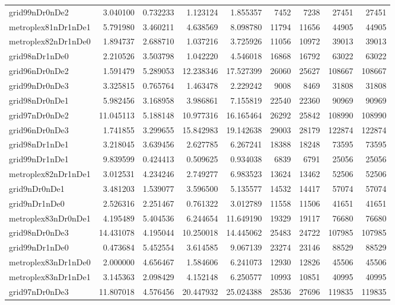 \begin{longtable}{|l|r|r|r|r|r|r|r|r|}
grid99nDr0nDe2 & 3.040100 & 0.732233 & 1.123124 & 1.855357 & 7452 & 7238 & 27451 & 27451 \\
metroplex81nDr1nDe1 & 5.791980 & 3.460211 & 4.638569 & 8.098780 & 11794 & 11656 & 44905 & 44905 \\
metroplex82nDr1nDe0 & 1.894737 & 2.688710 & 1.037216 & 3.725926 & 11056 & 10972 & 39013 & 39013 \\
grid98nDr1nDe0 & 2.210526 & 3.503798 & 1.042220 & 4.546018 & 16868 & 16792 & 63022 & 63022 \\
grid96nDr0nDe2 & 1.591479 & 5.289053 & 12.238346 & 17.527399 & 26060 & 25627 & 108667 & 108667 \\
grid99nDr0nDe3 & 3.325815 & 0.765764 & 1.463478 & 2.229242 & 9008 & 8469 & 31808 & 31808 \\
grid98nDr0nDe1 & 5.982456 & 3.168958 & 3.986861 & 7.155819 & 22540 & 22360 & 90969 & 90969 \\
grid97nDr0nDe2 & 11.045113 & 5.188148 & 10.977316 & 16.165464 & 26292 & 25842 & 108990 & 108990 \\
grid96nDr0nDe3 & 1.741855 & 3.299655 & 15.842983 & 19.142638 & 29003 & 28179 & 122874 & 122874 \\
grid98nDr1nDe1 & 3.218045 & 3.639456 & 2.627785 & 6.267241 & 18388 & 18248 & 73595 & 73595 \\
grid99nDr1nDe1 & 9.839599 & 0.424413 & 0.509625 & 0.934038 & 6839 & 6791 & 25056 & 25056 \\
metroplex82nDr1nDe1 & 3.012531 & 4.234246 & 2.749277 & 6.983523 & 13624 & 13462 & 52506 & 52506 \\
grid9nDr0nDe1 & 3.481203 & 1.539077 & 3.596500 & 5.135577 & 14532 & 14417 & 57074 & 57074 \\
grid9nDr1nDe0 & 2.526316 & 2.251467 & 0.761322 & 3.012789 & 11558 & 11506 & 41651 & 41651 \\
metroplex83nDr0nDe1 & 4.195489 & 5.404536 & 6.244654 & 11.649190 & 19329 & 19117 & 76680 & 76680 \\
grid98nDr0nDe3 & 14.431078 & 4.195044 & 10.250018 & 14.445062 & 25483 & 24722 & 107985 & 107985 \\
grid99nDr1nDe0 & 0.473684 & 5.452554 & 3.614585 & 9.067139 & 23274 & 23146 & 88529 & 88529 \\
metroplex83nDr1nDe0 & 2.000000 & 4.656467 & 1.584606 & 6.241073 & 12930 & 12826 & 45506 & 45506 \\
metroplex83nDr1nDe1 & 3.145363 & 2.098429 & 4.152148 & 6.250577 & 10993 & 10851 & 40995 & 40995 \\
grid97nDr0nDe3 & 11.807018 & 4.576456 & 20.447932 & 25.024388 & 28536 & 27696 & 119835 & 119835 \\

\end{longtable}
